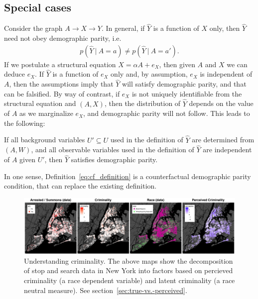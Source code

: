 \subsection{Special cases}
%
Consider the graph $A \rightarrow X \rightarrow Y$. In general, if $\hat Y$ is a function of
$X$ only, then $\hat Y$ need not obey demographic parity, i.e.
\begin{align}
  p(\hat Y\ |\ A = a) \neq p(\hat Y\ |\ A = a').\nonumber
\end{align}
If we postulate a
structural equation $X = \alpha A + e_X$, then given $A$ and $X$ we
can deduce $e_X$. If $\hat Y$ is a function of $e_X$ only and, by
assumption, $e_X$ is independent of $A$, then the assumptions imply
that $\hat Y$ will satisfy demographic parity, and that can be
falsified.
By way of contrast, if $e_X$ is not uniquely identifiable from the structural equation and $(A, X)$, then the distribution of $\hat Y$ depends on the value of $A$ as we marginalize $e_X$, and demographic parity will not follow. This leads to the following:
%
\begin{lem}
If all background variables $U' \subseteq U$ used in the definition of $\hat Y$ are determined from $(A, W)$, and all observable variables used in the definition of $\hat Y$ are independent of $A$ given $U'$, then $\hat Y$ satisfies demographic parity. %
\end{lem}
  
In one sense, Definition~\ref{eq:cf_definition} is a counterfactual
demographic parity condition, that can replace the
existing definition.

\begin{figure}[!th]
\begin{center}
\vspace{-2ex}
\centerline{\includegraphics[width=\textwidth]{stop_and_frisk_graphs.png}}
\vspace{-2ex}
\caption{Understanding criminality. The above maps show the decomposition of stop and search data in New York into factors based on percieved criminality (a race dependent variable) and latent criminality (a race neutral measure). See section~\ref{sec:true-vs.-perceived}.     \label{figure.criminality}\vspace{-7ex}}
\end{center}
\end{figure}

